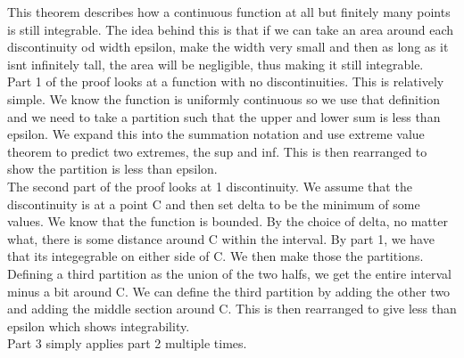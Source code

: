 \documentclass[12pt]{article}
\begin{document}
\begin{explanation}{}
This theorem describes how a continuous function at all but finitely many points is still integrable. The idea behind this is that if we can take an area around each discontinuity od width epsilon, make the width very small and then as long as it isnt infinitely tall, the area will be negligible, thus making it still integrable.\\
Part 1 of the proof looks at a function with no discontinuities. This is relatively simple. We know the function is uniformly continuous so we use that definition and we need to take a partition such that the upper and lower sum is less than epsilon. We expand this into the summation notation and use extreme value theorem to predict two extremes, the sup and inf. This is then rearranged to show the partition is less than epsilon.\\
The second part of the proof looks at 1 discontinuity. We assume that the discontinuity is at a point C and then set delta to be the minimum of some values. We know that the function is bounded. By the choice of delta, no matter what, there is some distance around C within the interval. By part 1, we have that its integegrable on either side of C. We then make those the partitions. Defining a third partition as the union of the two halfs, we get the entire interval minus a bit around C. We can define the third partition by adding the other two and adding the middle section around C. This is then rearranged to give less than epsilon which shows integrability. \\Part 3 simply applies part 2 multiple times.
\end{explanation}
\end{document}
